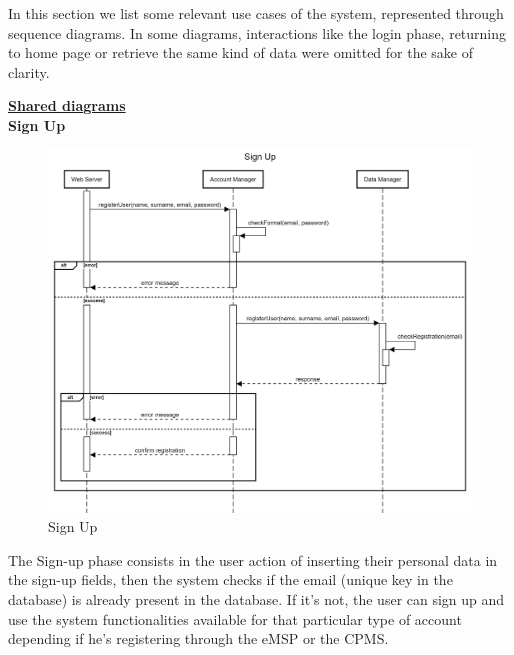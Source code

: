 \documentclass[table, 12pt]{article}
\begin{document}
In this section we list some relevant use cases of the system, represented through sequence diagrams. 
In some diagrams, interactions like the login phase, returning to home page or retrieve the same kind of data were omitted for the sake of clarity.

\newpage
\underline{\textbf{Shared diagrams}}\\
\textbf{Sign Up}
\begin{center}
    \begin{figure}[H]
        \includegraphics[scale=0.15, center]{assets/sequenceDiagrams/shared signup.png}
        \caption{Sign Up}
        \label{fig:signup}
    \end{figure}
\end{center}
The Sign-up phase consists in the user action of inserting their personal data in the sign-up fields, then the system checks if the email (unique key in the database) is already present in the database.
If it's not, the user can sign up and use the system functionalities available for that particular type of account depending if he's registering through the eMSP or the CPMS.

\newpage
\end{document}

